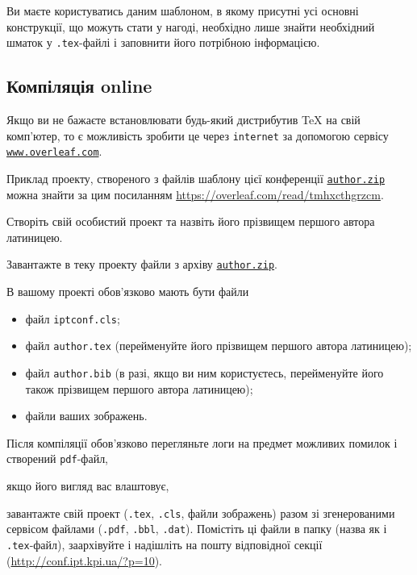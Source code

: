 \documentclass[]{iptconf}
\def\templateurl{%
\href{https://drive.google.com/file/d/1YrrTXnwaIcydBJLFS5BM6uj-yosnkRl3/view}%
{\texttt{author.zip}}}
\begin{document}
Ви маєте користуватись даним шаблоном, в якому присутні усі основні конструкції, що можуть стати у нагоді, необхідно лише знайти необхідний шматок у \texttt{.tex}-файлі і заповнити його потрібною інформацією.





\subsection{Компіляція online}

Якщо ви не бажаєте встановлювати будь-який дистрибутив \TeX{} на свій комп'ютер, то є
можливість зробити це через \texttt{internet} за допомогою сервісу	 \href{https://www.overleaf.com/}{\texttt{www.overleaf.com}}.

Приклад проекту, створеного з файлів шаблону  цієї конференції \templateurl{} можна знайти за цим посиланням   \url{https://overleaf.com/read/tmhxcthgrzcm}.

Створіть свій особистий проект та назвіть його прізвищем першого автора латиницею.

Завантажте в теку проекту файли з архіву \templateurl.

В вашому проекті обов'язково мають бути файли
\begin{itemize}
	\item файл \texttt{iptconf.cls};
	\item файл \texttt{author.tex} (перейменуйте його прізвищем першого автора латиницею);
	\item файл \texttt{author.bib} (в разі, якщо ви ним користуєтесь, перейменуйте його також прізвищем першого автора латиницею);
	\item файли ваших зображень.
\end{itemize}

\begin{tcolorbox}[breakable,enhanced,arc=0mm,colback=gray!5,colframe=red!80!black,leftrule=2mm]
	Після компіляції обов'язково перегляньте логи на предмет можливих помилок і створений \texttt{pdf}-файл,
\end{tcolorbox}

\noindent якщо його вигляд вас влаштовує,

\begin{tcolorbox}[breakable,enhanced,arc=0mm,colback=gray!5,colframe=red!80!black,leftrule=2mm]
	завантажте свій проект (\texttt{.tex}, \texttt{.cls}, файли зображень) разом зі згенерованими сервісом файлами (\texttt{.pdf}, \texttt{.bbl}, \texttt{.dat}). Помістіть ці файли в папку (назва як і \texttt{.tex}-файл), заархівуйте і надішліть на пошту відповідної секції (\url{http://conf.ipt.kpi.ua/?p=10}).
\end{tcolorbox}
\end{document}
